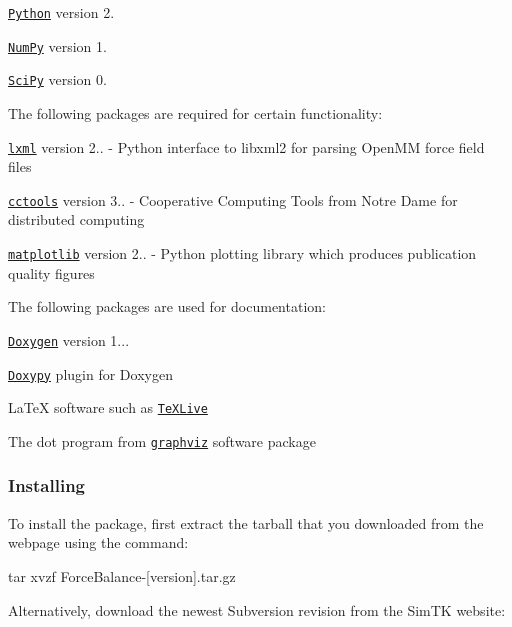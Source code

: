 \begin{DoxyItemize}
\item \href{http://www.python.org/}{\tt Python} version 2. \item \href{http://numpy.scipy.org/}{\tt Num\+Py} version 1. \item \href{http://www.scipy.org/}{\tt Sci\+Py} version 0.\end{DoxyItemize}
The following packages are required for certain functionality\+:

\begin{DoxyItemize}
\item \href{http://lxml.de/}{\tt lxml} version 2.. -\/ Python interface to libxml2 for parsing Open\+MM force field files \item \href{http://nd.edu/~ccl/software/}{\tt cctools} version 3.. -\/ Cooperative Computing Tools from Notre Dame for distributed computing \item \href{https://matplotlib.org}{\tt matplotlib} version 2.. -\/ Python plotting library which produces publication quality figures\end{DoxyItemize}
The following packages are used for documentation\+:

\begin{DoxyItemize}
\item \href{http://www.stack.nl/~dimitri/doxygen/}{\tt Doxygen} version 1... \item \href{http://code.foosel.org/doxypy}{\tt Doxypy} plugin for Doxygen \item La\+TeX software such as \href{http://www.tug.org/texlive/}{\tt Te\+X\+Live} \item The dot program from \href{http://www.graphviz.org/}{\tt graphviz} software package\end{DoxyItemize}
\hypertarget{installation_installing_forcebalance_install}{}\subsubsection{Installing}\label{installation_installing_forcebalance_install}
To install the package, first extract the tarball that you downloaded from the webpage using the command\+:

\begin{DoxyVerb}tar xvzf ForceBalance-[version].tar.gz \end{DoxyVerb}


Alternatively, download the newest Subversion revision from the Sim\+TK website\+:

